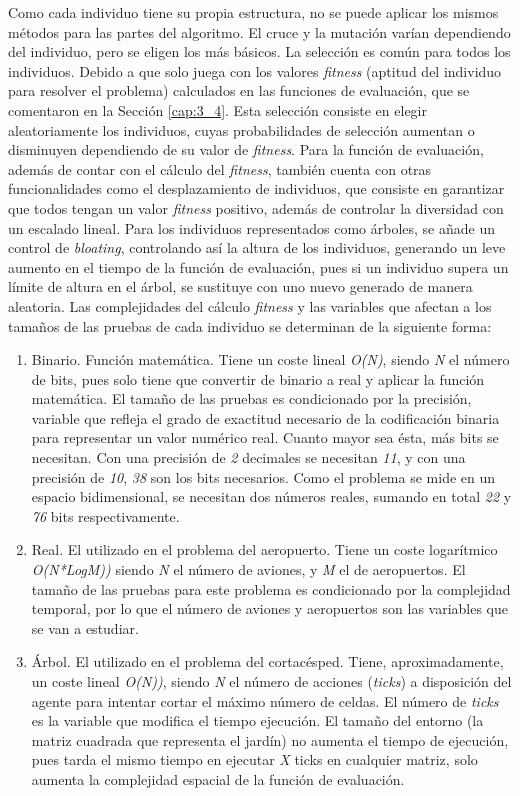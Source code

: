 	Como cada individuo tiene su propia estructura, no se puede aplicar los mismos métodos para las partes del algoritmo. El cruce y la mutación varían dependiendo del individuo, pero se eligen los más básicos. La selección es común para todos los individuos. Debido a que solo juega con los valores \textit{fitness} (aptitud del individuo para resolver el problema) calculados en las funciones de evaluación, que se comentaron en la Sección \ref{cap:3_4}. Esta selección consiste en elegir aleatoriamente los individuos, cuyas probabilidades de selección aumentan o disminuyen dependiendo de su valor de \textit{fitness}. Para la función de evaluación, además de contar con el cálculo del \textit{fitness}, también cuenta con otras funcionalidades como el desplazamiento de individuos, que consiste en garantizar que todos tengan un valor \textit{fitness} positivo, además de controlar la diversidad con un escalado lineal. Para los individuos representados como árboles, se añade un control de \textit{bloating}, controlando así la altura de los individuos, generando un leve aumento en el tiempo de la función de evaluación, pues si un individuo supera un límite de altura en el árbol, se sustituye con uno nuevo generado de manera aleatoria. Las complejidades del cálculo \textit{fitness} y las variables que afectan a los tamaños de las pruebas de cada individuo se determinan de la siguiente forma:
	\begin{enumerate}
		\item Binario. Función matemática. Tiene un coste lineal \textit{O(N)}, siendo \textit{N} el número de bits, pues solo tiene que convertir de binario a real y aplicar la función matemática. El tamaño de las pruebas es condicionado por la precisión, variable que refleja el grado de exactitud necesario de la codificación binaria para representar un valor numérico real. Cuanto mayor sea ésta, más bits se necesitan. Con una precisión de \textit{2} decimales se necesitan \textit{11}, y con una precisión de \textit{10}, \textit{38} son los bits necesarios. Como el problema se mide en un espacio bidimensional, se necesitan dos números reales, sumando en total \textit{22} y \textit{76} bits respectivamente. 
		\item Real. El utilizado en el problema del aeropuerto. Tiene un coste logarítmico \textit{O(N*LogM))} siendo \textit{N} el número de aviones, y \textit{M} el de aeropuertos. El tamaño de las pruebas para este problema es condicionado por la complejidad temporal, por lo que el número de aviones y aeropuertos son las variables que se van a estudiar.						
		\item Árbol. El utilizado en el problema del cortacésped. Tiene, aproximadamente, un coste lineal \textit{O(N))}, siendo \textit{N} el número de acciones (\textit{ticks}) a disposición del agente para intentar cortar el máximo número de celdas. El número de \textit{ticks} es la variable que modifica el tiempo ejecución. El tamaño del entorno (la matriz cuadrada que representa el jardín) no aumenta el tiempo de ejecución, pues tarda el mismo tiempo en ejecutar \textit{X} ticks en cualquier matriz, solo aumenta la complejidad espacial de la función de evaluación. 
	\end{enumerate}
	
